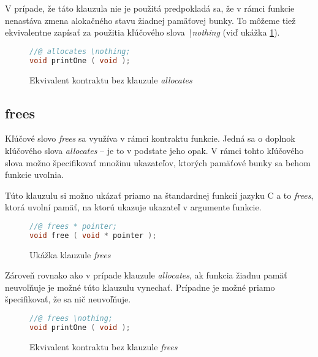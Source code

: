 V prípade, že táto klauzula nie je použitá predpokladá sa, že v rámci funkcie nenastáva zmena alokačného stavu žiadnej pamäťovej bunky. To môžeme tiež ekvivalentne zapísať za použitia kľúčového slova \emph{\textbackslash nothing} (viď ukážka \ref{fig:kontrakt-bez-allocates}).

\begin{figure}[H]
    \centering
    \captionsetup{justification=centering}
\begin{lstlisting}[language=C]
//@ allocates \nothing;
void printOne ( void );
\end{lstlisting}
    \caption{Ekvivalent kontraktu bez klauzule \emph{allocates}}
    \label{fig:kontrakt-bez-allocates}
\end{figure}

\subsection{frees}

Kľúčové slovo \emph{frees} sa využíva v rámci kontraktu funkcie. Jedná sa o doplnok kľúčového slova \emph{allocates} -- je to v podstate jeho opak. V rámci tohto kľúčového slova možno špecifikovať množinu ukazateľov, ktorých pamäťové bunky sa behom funkcie uvoľnia.

Túto klauzulu si možno ukázať priamo na štandardnej funkcií jazyku C a to \emph{frees}, ktorá uvolní pamäť, na ktorú ukazuje ukazateľ v argumente funkcie.

\begin{figure}[H]
    \centering
    \captionsetup{justification=centering}
\begin{lstlisting}[language=C]
//@ frees * pointer;
void free ( void * pointer );
\end{lstlisting}
    \caption{Ukážka klauzule \emph{frees}}
    \label{fig:kontrakt-frees}
\end{figure}

Zároveň rovnako ako v prípade klauzule \emph{allocates}, ak funkcia žiadnu pamäť neuvoľňuje je možné túto klauzulu vynechať. Prípadne je možné priamo špecifikovať, že sa nič neuvoľňuje.

\begin{figure}[H]
    \centering
    \captionsetup{justification=centering}
\begin{lstlisting}[language=C]
//@ frees \nothing;
void printOne ( void );
\end{lstlisting}
    \caption{Ekvivalent kontraktu bez klauzule \emph{frees}}
    \label{fig:kontrakt-bez-frees}
\end{figure}

